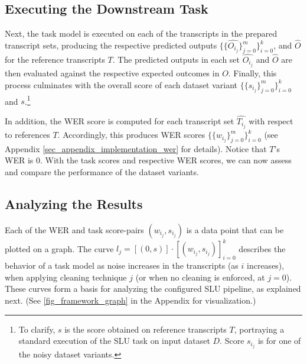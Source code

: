 \subsection{Executing the Downstream Task}
\label{sec_framework_task}
Next, the task model is executed on each of the transcripts in the prepared transcript sets, producing the respective predicted outputs $\{\{\widehat{O_{i_j}}\}_{j=0}^m\}_{i=0}^k$, and $\widehat{O}$ for the reference transcripts $T$. The predicted outputs in each set $\widehat{O_{i_j}}$ and $\widehat{O}$ are then evaluated against the respective expected outcomes in $O$. 
Finally, this process culminates with the overall score of each dataset variant $\{\{s_{i_j}\}_{j=0}^m\}_{i=0}^k$ and $s$.\footnote{To clarify, $s$ is the score obtained on reference transcripts $T$, portraying a standard execution of the SLU task on input dataset $D$. Score $s_{i_j}$ is for one of the noisy dataset variants.}

In addition, the WER score is computed for each transcript set $\widehat{T_{i_j}}$ with respect to references $T$. Accordingly, this produces WER scores $\{\{w_{i_j}\}_{j=0}^m\}_{i=0}^k$ (see Appendix \ref{sec_appendix_implementation_wer} for details). Notice that $T$'s WER is $0$. With the task scores and respective WER scores, we can now assess and compare the performance of the dataset variants.


\subsection{Analyzing the Results}
\label{sec_framework_analysis}

Each of the WER and task score-pairs $(w_{i_j}, s_{i_j})$ is a data point that can be plotted on a graph.
The curve $l_j = [(0, s)] \cdot [(w_{i_j}, s_{i_j})]_{i=0}^k$ describes the behavior of a task model as noise increases in the transcripts (as $i$ increases), when applying cleaning technique $j$ (or when no cleaning is enforced, at $j=0$).
These curves form a basis for analyzing the configured SLU pipeline, as explained next.
(See \autoref{fig_framework_graph} in the Appendix for visualization.)

